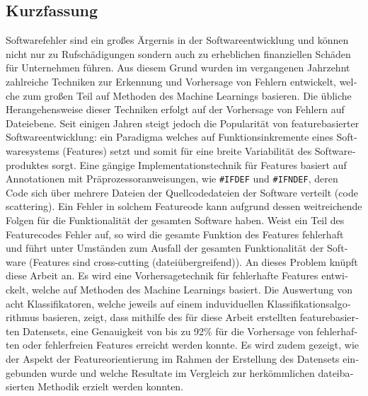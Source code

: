 
\begin{otherlanguage}{ngerman}
    \section*{Kurzfassung}

Softwarefehler sind ein großes Ärgernis in der Softwareentwicklung und können nicht nur zu Rufschädigungen sondern auch zu erheblichen finanziellen Schäden für Unternehmen führen. Aus diesem Grund wurden im vergangenen Jahrzehnt zahlreiche Techniken zur Erkennung und Vorhersage von Fehlern entwickelt, welche zum großen Teil auf Methoden des Machine Learnings basieren. Die übliche Herangehensweise dieser Techniken erfolgt auf der Vorhersage von Fehlern auf Dateiebene. Seit einigen Jahren steigt jedoch die Popularität von featurebasierter Softwareentwicklung: ein Paradigma welches auf Funktionsinkremente eines Softwaresystems (Features) setzt und somit für eine breite Variabilität des Softwareproduktes sorgt. Eine gängige Implementationstechnik für Features basiert auf Annotationen mit Präprozessoranweisungen, wie \texttt{\#IFDEF} und \texttt{\#IFNDEF}, deren Code sich über mehrere Dateien der Quellcodedateien der Software verteilt (\glqq code scattering\grqq). Ein Fehler in solchem Featureode kann aufgrund dessen weitreichende Folgen für die Funktionalität der gesamten Software haben. Weist ein Teil des Featurecodes Fehler auf, so wird die gesamte Funktion des Features fehlerhaft und führt unter Umständen zum Ausfall der gesamten Funktionalität der Software (Features sind \glqq cross-cutting\grqq{} (dateiübergreifend)). An dieses Problem knüpft diese Arbeit an. Es wird eine Vorhersagetechnik für fehlerhafte Features entwickelt, welche auf Methoden des Machine Learnings basiert. Die Auswertung von acht Klassifikatoren, welche jeweils auf einem induviduellen Klassifikationsalgorithmus basieren, zeigt, dass mithilfe des für diese Arbeit erstellten featurebasierten Datensets, eine Genauigkeit von bis zu 92\% für die Vorhersage von fehlerhaften oder fehlerfreien Features erreicht werden konnte. Es wird zudem gezeigt, wie der Aspekt der Featureorientierung im Rahmen der Erstellung des Datensets eingebunden wurde und welche Resultate im Vergleich zur herkömmlichen dateibasierten Methodik erzielt werden konnten.

\end{otherlanguage}

